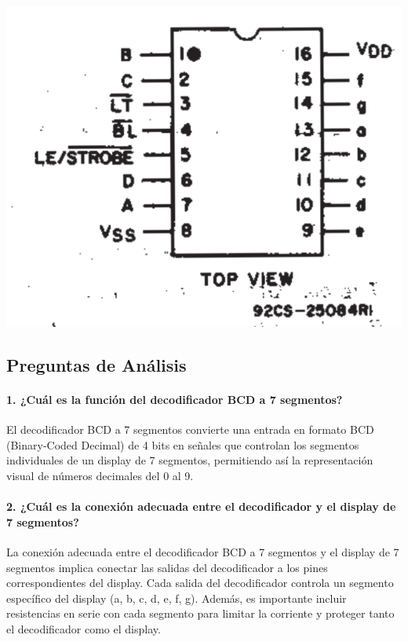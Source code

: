 \begin{table}[h!]
\begin{minipage}{0.5\textwidth}
        \includegraphics[width=\textwidth]{./imagenes/vista.png}

    \end{minipage}
\end{table}

        \subsection{Preguntas de Análisis}
        \paragraph{1. ¿Cuál es la función del decodificador BCD a 7 segmentos?}
        El decodificador BCD a 7 segmentos convierte una entrada en formato BCD (Binary-Coded Decimal) de 4 bits en señales que controlan los segmentos individuales de un display de 7 segmentos, permitiendo así la representación visual de números decimales del 0 al 9.

        \paragraph{2. ¿Cuál es la conexión adecuada entre el decodificador y el display de 7 segmentos?}
        La conexión adecuada entre el decodificador BCD a 7 segmentos y el display de 7 segmentos implica conectar las salidas del decodificador a los pines correspondientes del display. Cada salida del decodificador controla un segmento específico del display (a, b, c, d, e, f, g). Además, es importante incluir resistencias en serie con cada segmento para limitar la corriente y proteger tanto el decodificador como el display.

